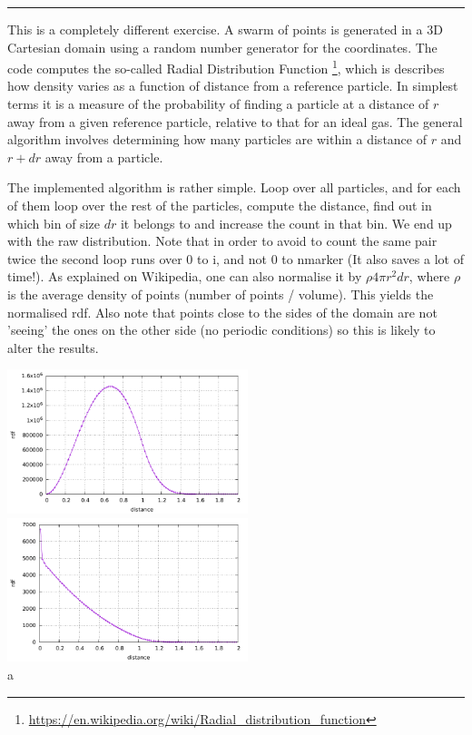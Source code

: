 \noindent\rule{\textwidth}{1pt}

This is a completely different exercise. A swarm of points is generated in a 3D Cartesian 
domain using a random number generator for the coordinates.
The code computes the so-called Radial Distribution Function
\footnote{\url{https://en.wikipedia.org/wiki/Radial_distribution_function}}, 
which is describes how density varies as a function of distance from a reference particle. 
In simplest terms it is a measure of the probability of finding a particle at a distance of $r$ 
away from a given reference particle, relative to that for an ideal gas. 
The general algorithm involves determining how many particles are within a distance of $r$ and $r+dr$ away from a particle. 

The implemented algorithm is rather simple. Loop over all particles, and for each of them 
loop over the rest of the particles, compute the distance, find out in which bin of size $dr$ it belongs 
to and increase the count in that bin. We end up with the raw distribution.
Note that in order to avoid to count the same pair twice the second loop 
runs over 0 to i, and not 0 to nmarker (It also saves a lot of time!).
As explained on Wikipedia, one can also normalise it by $\rho 4\pi r^2 dr$, where $\rho$ is
the average density of points (number of points / volume). This yields the 
normalised rdf. 
Also note that points close to the sides of the domain are not 'seeing' the ones 
on the other side (no periodic conditions) so this is likely to alter the results.

\begin{center}
\includegraphics[width=7cm]{python_codes/fieldstone_125/results/rdf/rdf}
\includegraphics[width=7cm]{python_codes/fieldstone_125/results/rdf/rdf_normalised}\\
{\captionfont a }
\end{center}
 


















